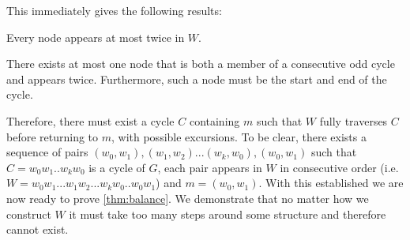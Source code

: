 This immediately gives the following results:
\begin{lemma}
   Every node appears at most twice in $W$. \label{lemma: Three is a magic number}
\end{lemma}
\begin{lemma}
    There exists at most one node that is both a member of a consecutive odd cycle and appears twice. Furthermore, such a node must be the start and end of the cycle.
\end{lemma}
Therefore, there must exist a cycle $C$ containing $m$ such that $W$ fully traverses $C$ before returning to $m$, with possible excursions.
To be clear, there exists a sequence of pairs $(w_0,w_1),(w_1,w_2)...(w_k,w_0),(w_0,w_1)$ such that $C=w_0w_1..w_kw_0$ is a cycle of $G$, each pair appears in $W$ in consecutive order (i.e. $W=w_0w_1...w_1w_2...w_kw_0..w_0w_1$) and $m=(w_0,w_1)$. 
With this established we are now ready to prove \cref{thm:balance}.
We demonstrate that no matter how we construct $W$ it must take too many steps around some structure and therefore cannot exist.
